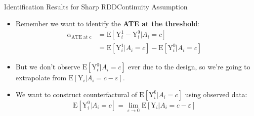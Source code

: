 \documentclass[dvipsnames,hyperref={pdfpagelabels=false}]{beamer}
\begin{document}
\begin{frame}{Identification Results for Sharp RDD}{Continuity Assumption}
	\begin{itemize}
		\item Remember we want to identify the \textbf{ATE at the threshold}:
		\begin{equation*}
		\begin{aligned}
		\alpha_{\text{ATE at c}} &=\mathrm{E}[\mathrm{Y}^{1}_{i}-\mathrm{Y}^{0}_{i}|A_i=c] \\
		&= \mathrm{E}[\mathrm{Y}^{1}_{i} |A_i=c] -\mathrm{E}[\mathrm{Y}^{0}_{i} |A_i=c]
		\end{aligned}
		\end{equation*}
		\item But we don't observe $\mathrm{E}[\mathrm{Y}^{0}_{i} |A_i=c]$ ever due to the design, so we're going to extrapolate from $\mathrm{E}[\mathrm{Y}_{i} |A_i=c-\varepsilon]$.
		\vspace{0.2cm}
		\item We want to construct counterfactural of $\mathrm{E}[\mathrm{Y}^{0}_{i}|A_i=c]$ using observed data: 
		\begin{equation*}
		\mathrm{E}[\mathrm{Y}^{0}_{i}|A_i=c]  = \lim_{\varepsilon\rightarrow 0}\mathrm{E}[\mathrm{Y}_{i}|A_i=c-\varepsilon]
		\end{equation*}
		
	\end{itemize}
\end{frame}
\end{document}

